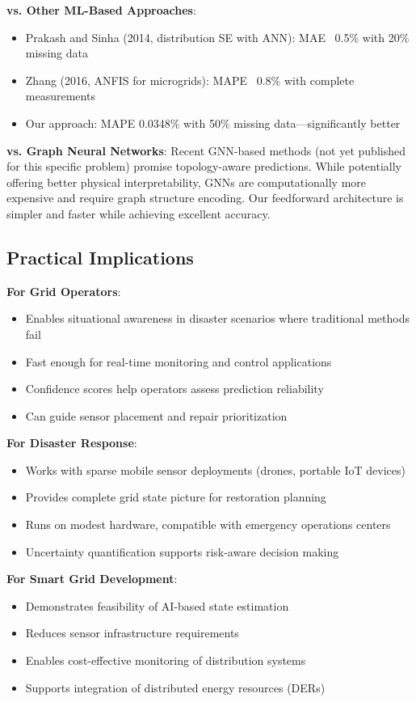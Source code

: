 \documentclass[12pt,a4paper]{report}
\begin{document}
\textbf{vs. Other ML-Based Approaches}:
\begin{itemize}
    \item Prakash and Sinha (2014, distribution SE with ANN): MAE ~0.5\% with 20\% missing data
    \item Zhang (2016, ANFIS for microgrids): MAPE ~0.8\% with complete measurements
    \item Our approach: MAPE 0.0348\% with 50\% missing data—significantly better
\end{itemize}

\textbf{vs. Graph Neural Networks}:
Recent GNN-based methods (not yet published for this specific problem) promise topology-aware predictions. While potentially offering better physical interpretability, GNNs are computationally more expensive and require graph structure encoding. Our feedforward architecture is simpler and faster while achieving excellent accuracy.

\subsection{Practical Implications}

\textbf{For Grid Operators}:
\begin{itemize}
    \item Enables situational awareness in disaster scenarios where traditional methods fail
    \item Fast enough for real-time monitoring and control applications
    \item Confidence scores help operators assess prediction reliability
    \item Can guide sensor placement and repair prioritization
\end{itemize}

\textbf{For Disaster Response}:
\begin{itemize}
    \item Works with sparse mobile sensor deployments (drones, portable IoT devices)
    \item Provides complete grid state picture for restoration planning
    \item Runs on modest hardware, compatible with emergency operations centers
    \item Uncertainty quantification supports risk-aware decision making
\end{itemize}

\textbf{For Smart Grid Development}:
\begin{itemize}
    \item Demonstrates feasibility of AI-based state estimation
    \item Reduces sensor infrastructure requirements
    \item Enables cost-effective monitoring of distribution systems
    \item Supports integration of distributed energy resources (DERs)
\end{itemize}
\end{document}
